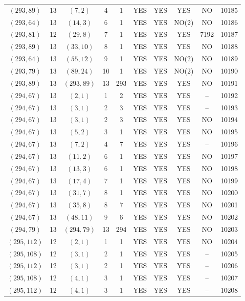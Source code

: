 \begin{longtable}{|c|c|c|c|c|c|c|c|c|c|}
$(293, 89)$ & 13 & $(7, 2)$ & 4 & 1 & YES & YES & YES & NO & 10185\\
$(293, 64)$ & 13 & $(14, 3)$ & 6 & 1 & YES & YES & NO(2) & NO & 10186\\
$(293, 81)$ & 12 & $(29, 8)$ & 7 & 1 & YES & YES & YES & 7192 & 10187\\
$(293, 89)$ & 13 & $(33, 10)$ & 8 & 1 & YES & YES & YES & NO & 10188\\
$(293, 64)$ & 13 & $(55, 12)$ & 9 & 1 & YES & YES & NO(2) & NO & 10189\\
$(293, 79)$ & 13 & $(89, 24)$ & 10 & 1 & YES & YES & NO(2) & NO & 10190\\
$(293, 89)$ & 13 & $(293, 89)$ & 13 & 293 & YES & YES & YES & NO & 10191\\
$(294, 67)$ & 13 & $(2, 1)$ & 1 & 2 & YES & YES & YES & -- & 10192\\
$(294, 67)$ & 13 & $(3, 1)$ & 2 & 3 & YES & YES & YES & -- & 10193\\
$(294, 67)$ & 13 & $(3, 1)$ & 2 & 3 & YES & YES & YES & NO & 10194\\
$(294, 67)$ & 13 & $(5, 2)$ & 3 & 1 & YES & YES & YES & NO & 10195\\
$(294, 67)$ & 13 & $(7, 2)$ & 4 & 7 & YES & YES & YES & -- & 10196\\
$(294, 67)$ & 13 & $(11, 2)$ & 6 & 1 & YES & YES & YES & NO & 10197\\
$(294, 67)$ & 13 & $(13, 3)$ & 6 & 1 & YES & YES & YES & NO & 10198\\
$(294, 67)$ & 13 & $(17, 4)$ & 7 & 1 & YES & YES & YES & NO & 10199\\
$(294, 67)$ & 13 & $(31, 7)$ & 8 & 1 & YES & YES & YES & NO & 10200\\
$(294, 67)$ & 13 & $(35, 8)$ & 8 & 7 & YES & YES & YES & NO & 10201\\
$(294, 67)$ & 13 & $(48, 11)$ & 9 & 6 & YES & YES & YES & NO & 10202\\
$(294, 79)$ & 13 & $(294, 79)$ & 13 & 294 & YES & YES & YES & NO & 10203\\
$(295, 112)$ & 12 & $(2, 1)$ & 1 & 1 & YES & YES & YES & NO & 10204\\
$(295, 108)$ & 12 & $(3, 1)$ & 2 & 1 & YES & YES & YES & -- & 10205\\
$(295, 112)$ & 12 & $(3, 1)$ & 2 & 1 & YES & YES & YES & -- & 10206\\
$(295, 108)$ & 12 & $(4, 1)$ & 3 & 1 & YES & YES & YES & -- & 10207\\
$(295, 112)$ & 12 & $(4, 1)$ & 3 & 1 & YES & YES & YES & -- & 10208\\

\end{longtable}

